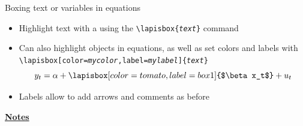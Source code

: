 \documentclass[10pt]{beamer}
\begin{document}
\begin{frame}
    {Boxing text or variables in equations}
    \begin{itemize}
        \item Highlight text with a  using the \texttt{\textbackslash lapisbox\{\textit{text}\}} command  \bigskip\bigskip
        \pause
        \item Can also highlight objects in equations, as well as set colors and labels with \texttt{\textbackslash lapisbox[color=\textit{mycolor},label=\textit{mylabel}]\{\textit{text}\}} \medskip
        \begin{equation*}
            y_{t} = \alpha + \lapisbox[color=tomato,label=box1]{$\beta x_t$} + u_{t} 
        \end{equation*}
        \smallskip\pause
        \item Labels allow to add arrows and comments as before
    \end{itemize}
\end{frame}
\begin{flushleft}
    \underline{\textbf{Notes}}\setlength{\parskip}{.15cm}\notesize\newline\par
\end{flushleft}
\end{document}
